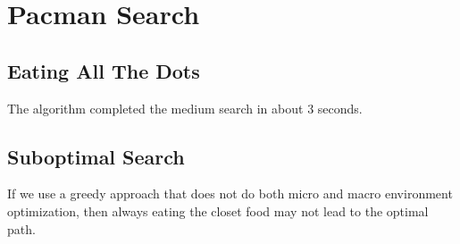 \documentclass[12pt]{article}
\begin{document}
\section{Pacman Search} 
\subsection{Eating All The Dots}
The algorithm completed the medium search in about 3 seconds. 

\subsection{Suboptimal Search}
If we use a greedy approach that does not do both micro and macro environment optimization, then always eating the closet food may not lead to the optimal path. 
 
  
\begin{small}

\end{small}
\end{document}
